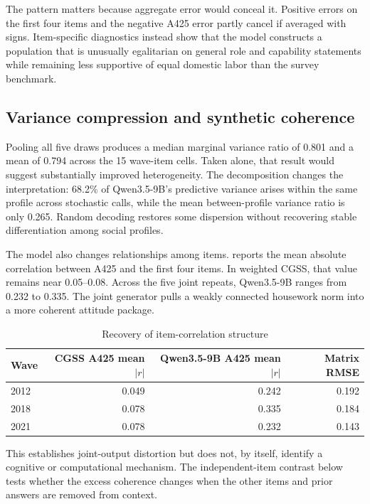 \documentclass[11pt]{article}
\begin{document}
The pattern matters because aggregate error would conceal it. Positive errors on the first four items and the negative A425 error partly cancel if averaged with signs. Item-specific diagnostics instead show that the model constructs a population that is unusually egalitarian on general role and capability statements while remaining less supportive of equal domestic labor than the survey benchmark.

\subsection{Variance compression and synthetic coherence}

Pooling all five draws produces a median marginal variance ratio of 0.801 and a mean of 0.794 across the 15 wave-item cells. Taken alone, that result would suggest substantially improved heterogeneity. The decomposition changes the interpretation: 68.2\% of Qwen3.5-9B's predictive variance arises within the same profile across stochastic calls, while the mean between-profile variance ratio is only 0.265. Random decoding restores some dispersion without recovering stable differentiation among social profiles.

The model also changes relationships among items.  reports the mean absolute correlation between A425 and the first four items. In weighted CGSS, that value remains near 0.05--0.08. Across the five joint repeats, Qwen3.5-9B ranges from 0.232 to 0.335. The joint generator pulls a weakly connected housework norm into a more coherent attitude package.

\begin{table}[H]
\centering
\caption{Recovery of item-correlation structure}
\label{tab:structure}
\begin{tabular}{lrrr}
\toprule
Wave & CGSS A425 mean $|r|$ & Qwen3.5-9B A425 mean $|r|$ & Matrix RMSE \\
\midrule
2012 & 0.049 & 0.242 & 0.192 \\
2018 & 0.078 & 0.335 & 0.184 \\
2021 & 0.078 & 0.232 & 0.143 \\
\bottomrule
\end{tabular}
\end{table}

This establishes joint-output distortion but does not, by itself, identify a cognitive or computational mechanism. The independent-item contrast below tests whether the excess coherence changes when the other items and prior answers are removed from context.
\end{document}
